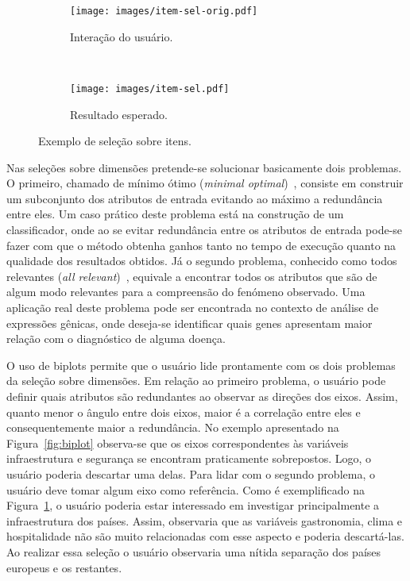 \begin{figure}[h!]
  \centering
  \begin{subfigure}[b]{0.45\textwidth}
    \centering
    \texttt{[image: images/item-sel-orig.pdf]}
    \caption{Interação do usuário.}
  \end{subfigure}%
  ~
  \begin{subfigure}[b]{0.45\textwidth}
    \centering
    \texttt{[image: images/item-sel.pdf]}
    \caption{Resultado esperado.}
  \end{subfigure} 
  \caption{Exemplo de seleção sobre itens.}
  \label{fig:item-sel}
\end{figure}

Nas seleções sobre dimensões pretende-se solucionar
basicamente dois problemas. O primeiro, chamado de mínimo
ótimo (\emph{minimal optimal})~\cite{Kohavi1997}, consiste
em construir um subconjunto dos atributos de entrada
evitando ao máximo a redundância entre eles. Um caso prático
deste problema está na construção de um classificador, onde
ao se evitar redundância entre os atributos de entrada
pode-se fazer com que o método obtenha ganhos tanto no tempo
de execução quanto na qualidade dos resultados obtidos. Já o
segundo problema, conhecido como todos relevantes (\emph{all
relevant})~\cite{Nilsson2007}, equivale a encontrar todos os
atributos que são de algum modo relevantes para a
compreensão do fenómeno observado. Uma aplicação real deste
problema pode ser encontrada no contexto de análise de
expressões gênicas, onde deseja-se identificar quais genes
apresentam maior relação com o diagnóstico de alguma doença. 

O uso de biplots permite que o usuário lide prontamente com
os dois problemas da seleção sobre dimensões. Em relação ao
primeiro problema, o usuário pode definir quais atributos
são redundantes ao observar as direções dos eixos. Assim,
quanto menor o ângulo entre dois eixos, maior é a correlação
entre eles e consequentemente maior a redundância. No
exemplo apresentado na Figura~\ref{fig:biplot} observa-se
que os eixos correspondentes às variáveis infraestrutura e
segurança se encontram praticamente sobrepostos. Logo, o
usuário poderia descartar uma delas. Para lidar com o
segundo problema, o usuário deve tomar algum eixo como
referência. Como é exemplificado na
Figura~\ref{fig:item-sel}, o usuário poderia estar
interessado em investigar principalmente a infraestrutura
dos países. Assim, observaria que as variáveis gastronomia,
clima e hospitalidade não são muito relacionadas com esse
aspecto e poderia descartá-las. Ao realizar essa seleção o
usuário observaria uma nítida separação dos países europeus
e os restantes.

